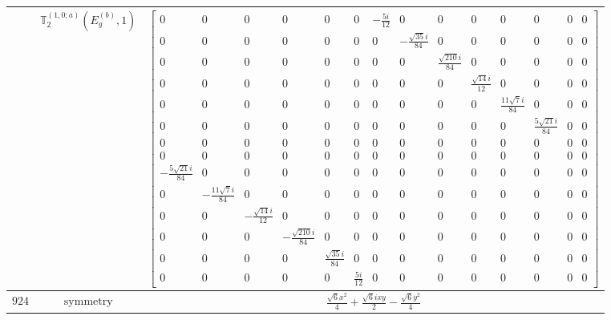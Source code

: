 \documentclass[fleqn,8pt,landscape]{jsarticle}
\begin{document}
\begin{longtable}{ccc}
$  $ & $ \mathbb{T}_{2}^{(1,0;a)}(E_{g}^{(b)},1) $ & $ \begin{bmatrix} 0 & 0 & 0 & 0 & 0 & 0 & - \frac{5 i}{12} & 0 & 0 & 0 & 0 & 0 & 0 & 0 \\ 0 & 0 & 0 & 0 & 0 & 0 & 0 & - \frac{\sqrt{35} i}{84} & 0 & 0 & 0 & 0 & 0 & 0 \\ 0 & 0 & 0 & 0 & 0 & 0 & 0 & 0 & \frac{\sqrt{210} i}{84} & 0 & 0 & 0 & 0 & 0 \\ 0 & 0 & 0 & 0 & 0 & 0 & 0 & 0 & 0 & \frac{\sqrt{14} i}{12} & 0 & 0 & 0 & 0 \\ 0 & 0 & 0 & 0 & 0 & 0 & 0 & 0 & 0 & 0 & \frac{11 \sqrt{7} i}{84} & 0 & 0 & 0 \\ 0 & 0 & 0 & 0 & 0 & 0 & 0 & 0 & 0 & 0 & 0 & \frac{5 \sqrt{21} i}{84} & 0 & 0 \\ 0 & 0 & 0 & 0 & 0 & 0 & 0 & 0 & 0 & 0 & 0 & 0 & 0 & 0 \\ 0 & 0 & 0 & 0 & 0 & 0 & 0 & 0 & 0 & 0 & 0 & 0 & 0 & 0 \\ - \frac{5 \sqrt{21} i}{84} & 0 & 0 & 0 & 0 & 0 & 0 & 0 & 0 & 0 & 0 & 0 & 0 & 0 \\ 0 & - \frac{11 \sqrt{7} i}{84} & 0 & 0 & 0 & 0 & 0 & 0 & 0 & 0 & 0 & 0 & 0 & 0 \\ 0 & 0 & - \frac{\sqrt{14} i}{12} & 0 & 0 & 0 & 0 & 0 & 0 & 0 & 0 & 0 & 0 & 0 \\ 0 & 0 & 0 & - \frac{\sqrt{210} i}{84} & 0 & 0 & 0 & 0 & 0 & 0 & 0 & 0 & 0 & 0 \\ 0 & 0 & 0 & 0 & \frac{\sqrt{35} i}{84} & 0 & 0 & 0 & 0 & 0 & 0 & 0 & 0 & 0 \\ 0 & 0 & 0 & 0 & 0 & \frac{5 i}{12} & 0 & 0 & 0 & 0 & 0 & 0 & 0 & 0 \end{bmatrix} $ \\ \hline
$ 924 $ & $ \text{symmetry} $ & $ \frac{\sqrt{6} x^{2}}{4} + \frac{\sqrt{6} i x y}{2} - \frac{\sqrt{6} y^{2}}{4} $ \\

\end{longtable}
\end{document}
